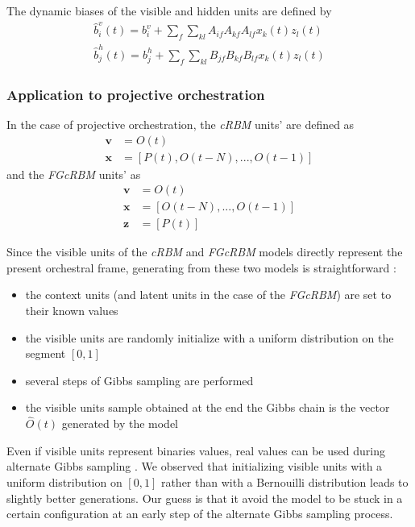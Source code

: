 \documentclass{article}
\begin{document}
The dynamic biases of the visible and hidden units are defined by
\begin{align}
\hat{b}_{i}^v(t) = b_{i}^v + \sum_{f} \sum_{kl}A_{if}A_{kf}A_{lf}x_{k}(t)z_{l}(t)\\
\hat{b}_{j}^h(t) = b_{j}^h + \sum_{f} \sum_{kl}B_{jf}B_{kf}B_{lf}x_{k}(t)z_{l}(t)
\end{align}

\subsubsection{Application to projective orchestration}
In the case of projective orchestration, the \textit{cRBM} units' are defined as
\begin{align*}
\bm{v} &= O(t) \\
\bm{x} &= \left[P(t), O(t-N), ..., O(t-1)\right]
\end{align*}
and the \textit{FGcRBM} units' as
\begin{align*}
\bm{v} &= O(t) \\
\bm{x} &= \left[O(t-N), ..., O(t-1)\right]\\
\bm{z} &= \left[P(t)\right]
\end{align*}

Since the visible units of the \textit{cRBM} and \textit{FGcRBM} models directly represent the present orchestral frame, generating from these two models is straightforward : 
\begin{itemize}
\item the context units (and latent units in the case of the \textit{FGcRBM}) are set to their known values
\item the visible units are randomly initialize with a uniform distribution on the segment $[0,1]$
\item several steps of Gibbs sampling are performed
\item the visible units sample obtained at the end the Gibbs chain is the vector $\hat{O}(t)$ generated by the model
\end{itemize}
Even if visible units represent binaries values, real values can be used during alternate Gibbs sampling \cite{hinton2010practical}. We observed that initializing visible units with a uniform distribution on $[0,1]$ rather than with a Bernouilli distribution leads to slightly better generations. Our guess is that it avoid the model to be stuck in a certain configuration at an early step of the alternate Gibbs sampling process.
\end{document}
